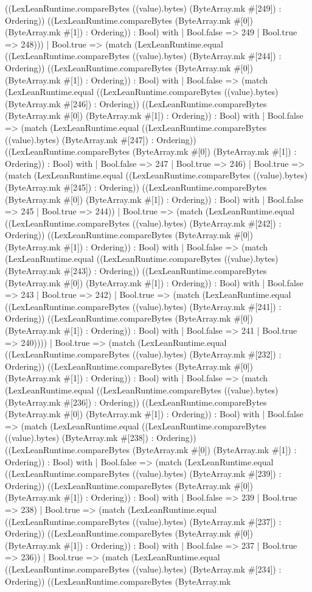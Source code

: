 \documentclass[11pt]{article}
\begin{document}
((LexLeanRuntime.compareBytes ((value).bytes) (ByteArray.mk \#[249]) : Ordering)) ((LexLeanRuntime.compareBytes (ByteArray.mk \#[0]) (ByteArray.mk \#[1]) : Ordering)) : Bool) with | Bool.false => 249 | Bool.true => 248))) | Bool.true => (match (LexLeanRuntime.equal ((LexLeanRuntime.compareBytes ((value).bytes) (ByteArray.mk \#[244]) : Ordering)) ((LexLeanRuntime.compareBytes (ByteArray.mk \#[0]) (ByteArray.mk \#[1]) : Ordering)) : Bool) with | Bool.false => (match (LexLeanRuntime.equal ((LexLeanRuntime.compareBytes ((value).bytes) (ByteArray.mk \#[246]) : Ordering)) ((LexLeanRuntime.compareBytes (ByteArray.mk \#[0]) (ByteArray.mk \#[1]) : Ordering)) : Bool) with | Bool.false => (match (LexLeanRuntime.equal ((LexLeanRuntime.compareBytes ((value).bytes) (ByteArray.mk \#[247]) : Ordering)) ((LexLeanRuntime.compareBytes (ByteArray.mk \#[0]) (ByteArray.mk \#[1]) : Ordering)) : Bool) with | Bool.false => 247 | Bool.true => 246) | Bool.true => (match (LexLeanRuntime.equal ((LexLeanRuntime.compareBytes ((value).bytes) (ByteArray.mk \#[245]) : Ordering)) ((LexLeanRuntime.compareBytes (ByteArray.mk \#[0]) (ByteArray.mk \#[1]) : Ordering)) : Bool) with | Bool.false => 245 | Bool.true => 244)) | Bool.true => (match (LexLeanRuntime.equal ((LexLeanRuntime.compareBytes ((value).bytes) (ByteArray.mk \#[242]) : Ordering)) ((LexLeanRuntime.compareBytes (ByteArray.mk \#[0]) (ByteArray.mk \#[1]) : Ordering)) : Bool) with | Bool.false => (match (LexLeanRuntime.equal ((LexLeanRuntime.compareBytes ((value).bytes) (ByteArray.mk \#[243]) : Ordering)) ((LexLeanRuntime.compareBytes (ByteArray.mk \#[0]) (ByteArray.mk \#[1]) : Ordering)) : Bool) with | Bool.false => 243 | Bool.true => 242) | Bool.true => (match (LexLeanRuntime.equal ((LexLeanRuntime.compareBytes ((value).bytes) (ByteArray.mk \#[241]) : Ordering)) ((LexLeanRuntime.compareBytes (ByteArray.mk \#[0]) (ByteArray.mk \#[1]) : Ordering)) : Bool) with | Bool.false => 241 | Bool.true => 240)))) | Bool.true => (match (LexLeanRuntime.equal ((LexLeanRuntime.compareBytes ((value).bytes) (ByteArray.mk \#[232]) : Ordering)) ((LexLeanRuntime.compareBytes (ByteArray.mk \#[0]) (ByteArray.mk \#[1]) : Ordering)) : Bool) with | Bool.false => (match (LexLeanRuntime.equal ((LexLeanRuntime.compareBytes ((value).bytes) (ByteArray.mk \#[236]) : Ordering)) ((LexLeanRuntime.compareBytes (ByteArray.mk \#[0]) (ByteArray.mk \#[1]) : Ordering)) : Bool) with | Bool.false => (match (LexLeanRuntime.equal ((LexLeanRuntime.compareBytes ((value).bytes) (ByteArray.mk \#[238]) : Ordering)) ((LexLeanRuntime.compareBytes (ByteArray.mk \#[0]) (ByteArray.mk \#[1]) : Ordering)) : Bool) with | Bool.false => (match (LexLeanRuntime.equal ((LexLeanRuntime.compareBytes ((value).bytes) (ByteArray.mk \#[239]) : Ordering)) ((LexLeanRuntime.compareBytes (ByteArray.mk \#[0]) (ByteArray.mk \#[1]) : Ordering)) : Bool) with | Bool.false => 239 | Bool.true => 238) | Bool.true => (match (LexLeanRuntime.equal ((LexLeanRuntime.compareBytes ((value).bytes) (ByteArray.mk \#[237]) : Ordering)) ((LexLeanRuntime.compareBytes (ByteArray.mk \#[0]) (ByteArray.mk \#[1]) : Ordering)) : Bool) with | Bool.false => 237 | Bool.true => 236)) | Bool.true => (match (LexLeanRuntime.equal ((LexLeanRuntime.compareBytes ((value).bytes) (ByteArray.mk \#[234]) : Ordering)) ((LexLeanRuntime.compareBytes (ByteArray.mk 
\end{document}
